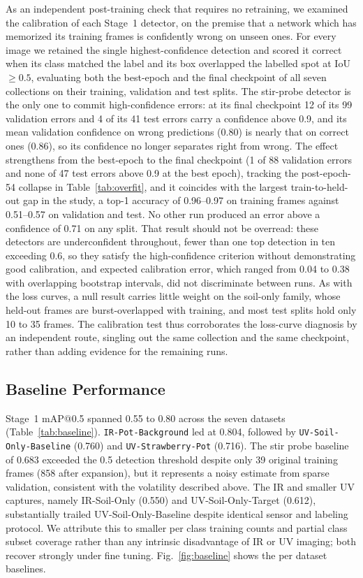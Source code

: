 ﻿\documentclass[journal]{IEEEtran}
\begin{document}
As an independent post-training check that requires no retraining, we examined the calibration of each Stage~1 detector, on the premise that a network which has memorized its training frames is confidently wrong on unseen ones. For every image we retained the single highest-confidence detection and scored it correct when its class matched the label and its box overlapped the labelled spot at IoU~$\geq 0.5$, evaluating both the best-epoch and the final checkpoint of all seven collections on their training, validation and test splits. The stir-probe detector is the only one to commit high-confidence errors: at its final checkpoint 12 of its 99 validation errors and 4 of its 41 test errors carry a confidence above 0.9, and its mean validation confidence on wrong predictions (0.80) is nearly that on correct ones (0.86), so its confidence no longer separates right from wrong. The effect strengthens from the best-epoch to the final checkpoint (1 of 88 validation errors and none of 47 test errors above 0.9 at the best epoch), tracking the post-epoch-54 collapse in Table~\ref{tab:overfit}, and it coincides with the largest train-to-held-out gap in the study, a top-1 accuracy of 0.96--0.97 on training frames against 0.51--0.57 on validation and test. No other run produced an error above a confidence of 0.71 on any split. That result should not be overread: these detectors are underconfident throughout, fewer than one top detection in ten exceeding 0.6, so they satisfy the high-confidence criterion without demonstrating good calibration, and expected calibration error, which ranged from 0.04 to 0.38 with overlapping bootstrap intervals, did not discriminate between runs. As with the loss curves, a null result carries little weight on the soil-only family, whose held-out frames are burst-overlapped with training, and most test splits hold only 10 to 35 frames. The calibration test thus corroborates the loss-curve diagnosis by an independent route, singling out the same collection and the same checkpoint, rather than adding evidence for the remaining runs.

\subsection{Baseline Performance}
Stage~1 mAP@0.5 spanned 0.55 to 0.80 across the seven datasets (Table~\ref{tab:baseline}). \texttt{IR-Pot-Background} led at 0.804, followed by \texttt{UV-Soil-Only-Baseline} (0.760) and \texttt{UV-Strawberry-Pot} (0.716). The stir probe baseline of 0.683 exceeded the 0.5 detection threshold despite only 39 original training frames (858 after expansion), but it represents a noisy estimate from sparse validation, consistent with the volatility described above. The IR and smaller UV captures, namely IR-Soil-Only (0.550) and UV-Soil-Only-Target (0.612), substantially trailed UV-Soil-Only-Baseline despite identical sensor and labeling protocol. We attribute this to smaller per class training counts and partial class subset coverage rather than any intrinsic disadvantage of IR or UV imaging; both recover strongly under fine tuning. Fig.~\ref{fig:baseline} shows the per dataset baselines.
\end{document}
